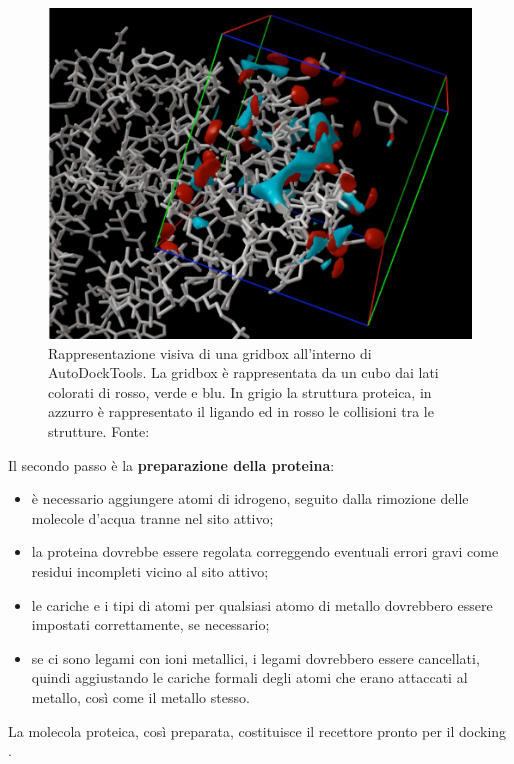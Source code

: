 \begin{figure}[H]
    \centering
    \includegraphics[scale=0.5]{images/gridbox.jpg}
    \caption[Rappresentazione visiva di una gridbox in AutoDockTools]{Rappresentazione visiva di una gridbox all'interno di AutoDockTools. La gridbox è rappresentata da un cubo dai lati colorati di rosso, verde e blu. In grigio la struttura proteica, in azzurro è rappresentato il ligando ed in rosso le collisioni tra le strutture. Fonte: \cite{eberhardt_autodock_nodate}}
    \label{fig:gridbox}
\end{figure}


Il secondo passo è la \textbf{preparazione della proteina}: 
\begin{itemize}
    \item è necessario aggiungere atomi di idrogeno, seguito dalla rimozione delle molecole d'acqua tranne nel sito attivo;
    \item la proteina dovrebbe essere regolata correggendo eventuali errori gravi come residui incompleti vicino al sito attivo;
    \item le cariche e i tipi di atomi per qualsiasi atomo di metallo dovrebbero essere impostati correttamente, se necessario;
    \item se ci sono legami con ioni metallici, i legami dovrebbero essere cancellati, quindi aggiustando le cariche formali degli atomi che erano attaccati al metallo, così come il metallo stesso. 
\end{itemize}
La molecola proteica, così preparata, costituisce il recettore pronto per il docking \cite{roy_chapter_2015}.


